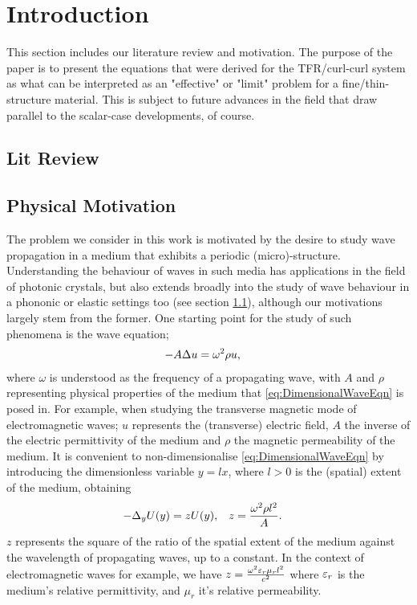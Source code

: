 \section{Introduction} \label{sec:Intro}

This section includes our literature review and motivation.
The purpose of the paper is to present the equations that were derived for the TFR/curl-curl system as what can be interpreted as an "effective" or "limit" problem for a fine/thin-structure material.
This is subject to future advances in the field that draw parallel to the scalar-case developments, of course.

\subsection{Lit Review} \label{ssec:LitReview}

\subsection{Physical Motivation} \label{ssec:PhysMot}
The problem we consider in this work is motivated by the desire to study wave propagation in a medium that exhibits a periodic (micro)-structure.
Understanding the behaviour of waves in such media has applications in the field of photonic crystals, but also extends broadly into the study of wave behaviour in a phononic  or elastic settings too (see section \ref{ssec:LitReview}), although our motivations largely stem from the former.
One starting point for the study of such phenomena is the wave equation;
\begin{align} \label{eq:DimensionalWaveEqn}
	-A \Delta u &= \omega^2 \rho u,
\end{align}
where $\omega$ is understood as the frequency of a propagating wave, with $A$ and $\rho$ representing physical properties of the medium that \eqref{eq:DimensionalWaveEqn} is posed in.
For example, when studying the transverse magnetic mode of electromagnetic waves; $u$ represents the (transverse) electric field, $A$ the inverse of the electric permittivity of the medium and $\rho$ the magnetic permeability of the medium.
It is convenient to non-dimensionalise \eqref{eq:DimensionalWaveEqn} by introducing the dimensionless variable $y=lx$, where $l>0$ is the (spatial) extent of the medium, obtaining
\begin{align} \label{eq:NonDimensionalWaveEqn}
	-\Delta_{y} U(y) = z U(y), &\quad z = \frac{\omega^2 \rho l^2}{A}.
\end{align}
$z$ represents the square of the ratio of the spatial extent of the medium against the wavelength of propagating waves, up to a constant.
In the context of electromagnetic waves for example, we have $z = \frac{\omega^2 \varepsilon_{r}\mu_{r} l^2}{c^2}$ where $\varepsilon_{r}$ is the medium's relative permittivity, and $\mu_{r}$ it's relative permeability. \newline

